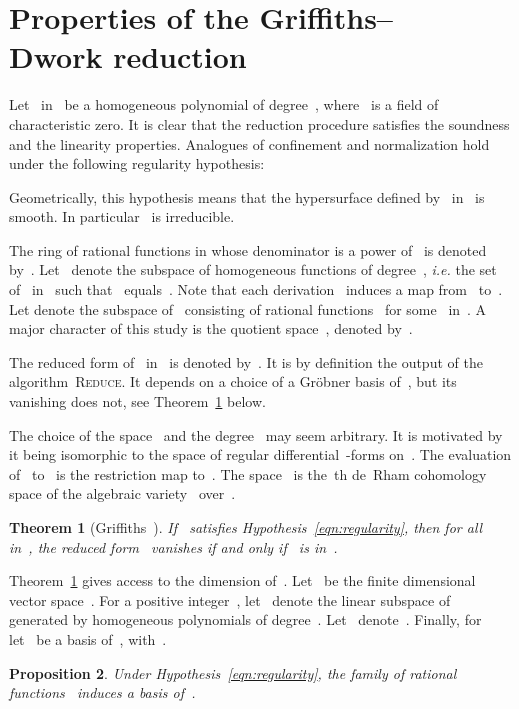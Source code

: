 \documentclass{sig-alternate}
\newtheorem{thm}{Theorem}
\newtheorem{prop}[thm]{Proposition}
\newcommand{\tReduce}{\textsc{Reduce}}
\begin{document}
\section{Properties of the Griffiths--\\Dwork reduction}
\label{sec:prop-grif}
\noindent Let~ in~ be a homogeneous polynomial of degree~, where~ is a field of characteristic zero.
It is clear that the reduction procedure satisfies the soundness and the linearity properties.
Analogues of confinement and normalization hold under the following regularity hypothesis: 

Geometrically, this hypothesis means that the hypersurface defined by~ in~ is smooth.
In particular~ is irreducible.

The ring of rational functions in  whose denominator is a power of~ is denoted by~.
Let~ denote the subspace of homogeneous functions of degree~, \emph{i.e.} the set of~ in~ such that~ equals~.
Note that each derivation~ induces a map from~ to~.
Let  denote the subspace of~ consisting of rational functions~ for some~ in~.
A major character of this study is the quotient space~, denoted by~.

The reduced form of~ in~ is denoted by~.
It is by definition the output of the algorithm~\tReduce.
It depends on a choice of a Gröbner basis of~, but its vanishing does not, see Theorem~\ref{thm:griffiths} below.

The choice of the space~ and the degree~ may seem arbitrary. It is motivated by it being isomorphic to the space of regular differential~-forms on~.
The evaluation of~ to~ is the restriction map to~.
The space~ is the~th de~Rham cohomology space of the algebraic variety~ over~.



\begin{thm}[Griffiths~{\cite[\S4]{Gri69}}]\label{thm:griffiths}
  \hspace{.5em} If~ satisfies Hypothesis~\eqref{eqn:regularity},
   then for all~ in~,
 the reduced form~ vanishes if and only if~ is in~.
\end{thm}


Theorem~\ref{thm:griffiths} gives access to the dimension of~.
Let~ be the finite dimensional vector space~.
For a positive integer~, let~ denote the linear subspace of~ generated by homogeneous polynomials of degree~. 
Let~ denote~.
Finally, for~ let~ be a basis of~, with~. 

\begin{prop}\label{coro:hbasis}
Under Hypothesis~\eqref{eqn:regularity}, the family of rational functions~ induces a basis of~.
\end{prop}
\end{document}
